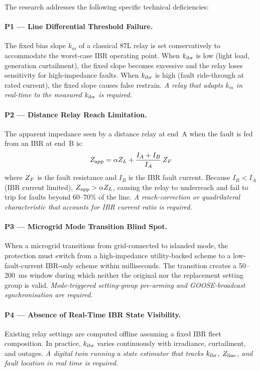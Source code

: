 The research addresses the following specific technical deficiencies:

\paragraph{P1 — Line Differential Threshold Failure.}
The fixed bias slope $k_m$ of a classical 87L relay is set conservatively to
accommodate the worst-case IBR operating point. When $k_{\mathrm{ibr}}$ is low (light
load, generation curtailment), the fixed slope becomes excessive and the relay
loses sensitivity for high-impedance faults. When $k_{\mathrm{ibr}}$ is high (fault
ride-through at rated current), the fixed slope causes false restrain.
\emph{A relay that adapts $k_m$ in real-time to the measured $k_{\mathrm{ibr}}$ is required.}

\paragraph{P2 — Distance Relay Reach Limitation.}
The apparent impedance seen by a distance relay at end~A when the fault
is fed from an IBR at end~B is:
\begin{equation}
  Z_{\mathrm{app}} = \alpha Z_L + \frac{I_A + I_B}{I_A}\, Z_F
  \label{eq:ch1_infeed}
\end{equation}
where $Z_F$ is the fault resistance and $I_B$ is the IBR fault current.
Because $I_B < I_A$ (IBR current limited), $Z_{\mathrm{app}} > \alpha Z_L$, causing
the relay to underreach and fail to trip for faults beyond 60--70\% of
the line. \emph{A reach-correction or quadrilateral characteristic that
accounts for IBR current ratio is required.}

\paragraph{P3 — Microgrid Mode Transition Blind Spot.}
When a microgrid transitions from grid-connected to islanded mode, the
protection must switch from a high-impedance utility-backed scheme to a
low-fault-current IBR-only scheme within milliseconds. The transition
creates a 50--200~ms window during which neither the original nor the
replacement setting group is valid. \emph{Mode-triggered setting-group
pre-arming and GOOSE-broadcast synchronisation are required.}

\paragraph{P4 — Absence of Real-Time IBR State Visibility.}
Existing relay settings are computed offline assuming a fixed IBR fleet
composition. In practice, $k_{\mathrm{ibr}}$ varies continuously with irradiance,
curtailment, and outages. \emph{A digital twin running a state estimator
that tracks $k_{\mathrm{ibr}}$, $Z_{\mathrm{line}}$, and fault location in real time is required.}

